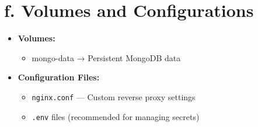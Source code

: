 \documentclass[12pt]{article}
\begin{document}
\section*{f. Volumes and Configurations}
\begin{itemize}
  \item \textbf{Volumes:}
  \begin{itemize}
    \item mongo-data → Persistent MongoDB data
  \end{itemize}
  \item \textbf{Configuration Files:}
  \begin{itemize}
    \item \texttt{nginx.conf} — Custom reverse proxy settings
    \item \texttt{.env} files (recommended for managing secrets)
  \end{itemize}
\end{itemize}
\end{document}
